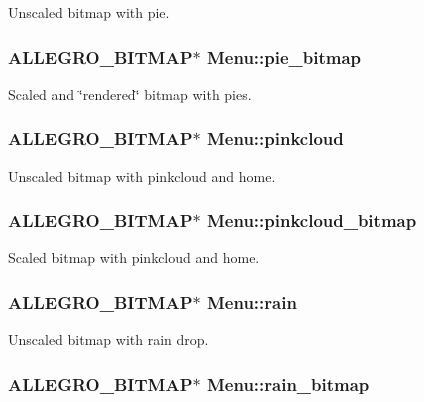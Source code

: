 \-Unscaled bitmap with pie. \hypertarget{structMenu_ab46ce3041264bac0aabde3abd7549877}{
\subsubsection[{pie\-\_\-bitmap}]{\setlength{\rightskip}{0pt plus 5cm}\-A\-L\-L\-E\-G\-R\-O\-\_\-\-B\-I\-T\-M\-A\-P$\ast$ {\bf \-Menu\-::pie\-\_\-bitmap}}}\label{structMenu_ab46ce3041264bac0aabde3abd7549877}
\-Scaled and \char`\"{}rendered\char`\"{} bitmap with pies. \hypertarget{structMenu_aec110fca9c47ccf9aaf6e4e7589b86f2}{
\subsubsection[{pinkcloud}]{\setlength{\rightskip}{0pt plus 5cm}\-A\-L\-L\-E\-G\-R\-O\-\_\-\-B\-I\-T\-M\-A\-P$\ast$ {\bf \-Menu\-::pinkcloud}}}\label{structMenu_aec110fca9c47ccf9aaf6e4e7589b86f2}
\-Unscaled bitmap with pinkcloud and home. \hypertarget{structMenu_a970ef9c492ae797fc59d22fa6cfead71}{
\subsubsection[{pinkcloud\-\_\-bitmap}]{\setlength{\rightskip}{0pt plus 5cm}\-A\-L\-L\-E\-G\-R\-O\-\_\-\-B\-I\-T\-M\-A\-P$\ast$ {\bf \-Menu\-::pinkcloud\-\_\-bitmap}}}\label{structMenu_a970ef9c492ae797fc59d22fa6cfead71}
\-Scaled bitmap with pinkcloud and home. \hypertarget{structMenu_a3ba357f6bd47ac51f9aa9b9c381bbe9f}{
\subsubsection[{rain}]{\setlength{\rightskip}{0pt plus 5cm}\-A\-L\-L\-E\-G\-R\-O\-\_\-\-B\-I\-T\-M\-A\-P$\ast$ {\bf \-Menu\-::rain}}}\label{structMenu_a3ba357f6bd47ac51f9aa9b9c381bbe9f}
\-Unscaled bitmap with rain drop. \hypertarget{structMenu_a9207cdbfc8c670d9069c9a2c64c6ca95}{
\subsubsection[{rain\-\_\-bitmap}]{\setlength{\rightskip}{0pt plus 5cm}\-A\-L\-L\-E\-G\-R\-O\-\_\-\-B\-I\-T\-M\-A\-P$\ast$ {\bf \-Menu\-::rain\-\_\-bitmap}}}\label{structMenu_a9207cdbfc8c670d9069c9a2c64c6ca95}
